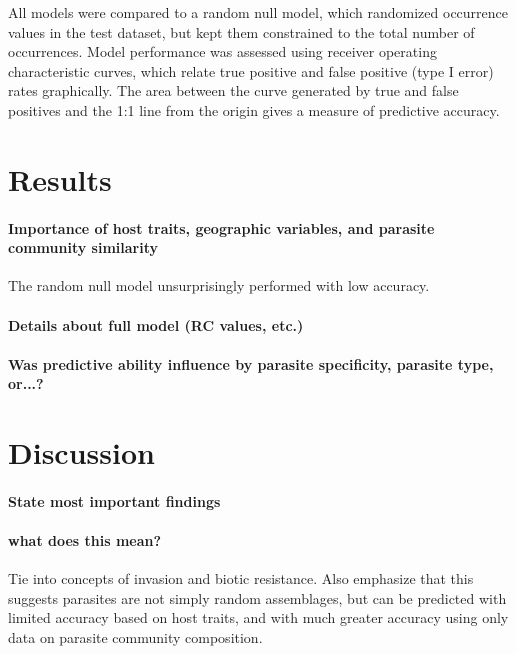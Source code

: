 \documentclass[12pt]{article}
\begin{document}
  All models were compared to a random null model, which randomized occurrence values in the test dataset, but kept them constrained to the total number of occurrences. Model performance was assessed using receiver operating characteristic curves, which relate true positive and false positive (type I error) rates graphically. The area between the curve generated by true and false positives and the 1:1 line from the origin gives a measure of predictive accuracy. 
  
   
\section{Results}

  \paragraph{Importance of host traits, geographic variables, and parasite community similarity}
  The random null model unsurprisingly performed with low accuracy.
  
  
  
  \paragraph{Details about full model (RC values, etc.)}
  
  
  
  \paragraph{Was predictive ability influence by parasite specificity, parasite type, or...?} 
  
 
  

\section{Discussion}
 
  \paragraph{State most important findings}
  
  
  \paragraph{what does this mean?}
  Tie into concepts of invasion and biotic resistance. Also emphasize that this suggests parasites are not simply random assemblages, but can be predicted with limited accuracy based on host traits, and with much greater accuracy using only data on parasite community composition. 
 
\end{document}
